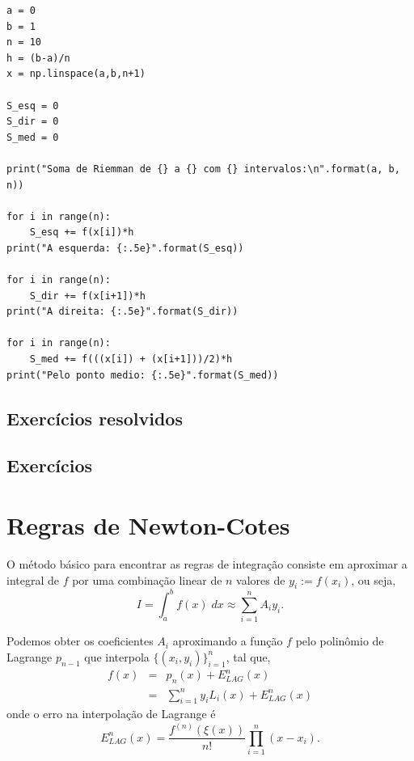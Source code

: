 \begin{ex}
\begin{verbatim}
a = 0
b = 1
n = 10
h = (b-a)/n
x = np.linspace(a,b,n+1)

S_esq = 0
S_dir = 0
S_med = 0

print("Soma de Riemman de {} a {} com {} intervalos:\n".format(a, b, n))

for i in range(n):
    S_esq += f(x[i])*h
print("A esquerda: {:.5e}".format(S_esq))

for i in range(n):
    S_dir += f(x[i+1])*h
print("A direita: {:.5e}".format(S_dir))

for i in range(n):
    S_med += f(((x[i]) + (x[i+1]))/2)*h
print("Pelo ponto medio: {:.5e}".format(S_med))
\end{verbatim}
\fi
\end{ex}

\subsection*{Exercícios resolvidos}

\construirExeresol

\subsection*{Exercícios}

\construirExer


\section{Regras de Newton-Cotes}


O método básico para encontrar as regras de integração consiste em aproximar a integral de $f$ por uma combinação linear de $n$ valores de $y_i := f(x_i)$, ou seja,
\begin{equation}
I = \int_a^b f(x) \;dx \approx \sum_{i=1}^nA_iy_i.
\end{equation}


Podemos obter os coeficientes $A_i$ aproximando a função $f$ pelo polinômio de Lagrange $p_{n-1}$ que interpola $\{(x_i,y_i)\}_{i=1}^n$, tal que,
\begin{eqnarray}
  f(x) &=& p_n(x)+E^n_{LAG}(x) \\
       &=& \sum_{i=1}^n y_iL_i(x)+E^n_{LAG}(x)
\end{eqnarray}
onde o erro na interpolação de Lagrange é
\begin{equation}
   E^n_{LAG}(x)=\frac{f^{(n)}(\xi(x))}{n!}\prod_{i=1}^n(x-x_i).
\end{equation}


